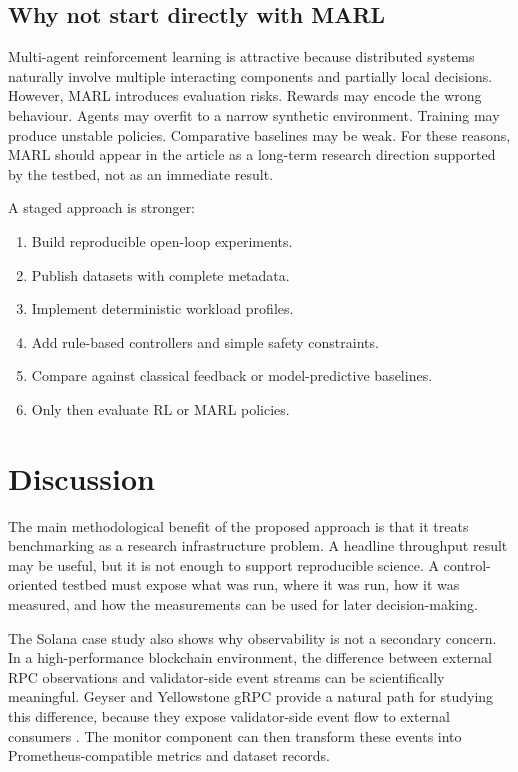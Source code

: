 \documentclass[11pt,a4paper]{article}
\begin{document}
\subsection{Why not start directly with MARL}
\label{subsec:why-not-marl}

Multi-agent reinforcement learning is attractive because distributed systems naturally involve multiple interacting components and partially local decisions. However, MARL introduces evaluation risks. Rewards may encode the wrong behaviour. Agents may overfit to a narrow synthetic environment. Training may produce unstable policies. Comparative baselines may be weak. For these reasons, MARL should appear in the article as a long-term research direction supported by the testbed, not as an immediate result.

A staged approach is stronger:

\begin{enumerate}
  \item Build reproducible open-loop experiments.
  \item Publish datasets with complete metadata.
  \item Implement deterministic workload profiles.
  \item Add rule-based controllers and simple safety constraints.
  \item Compare against classical feedback or model-predictive baselines.
  \item Only then evaluate RL or MARL policies.
\end{enumerate}

\section{Discussion}
\label{sec:discussion}

The main methodological benefit of the proposed approach is that it treats benchmarking as a research infrastructure problem. A headline throughput result may be useful, but it is not enough to support reproducible science. A control-oriented testbed must expose what was run, where it was run, how it was measured, and how the measurements can be used for later decision-making.

The Solana case study also shows why observability is not a secondary concern. In a high-performance blockchain environment, the difference between external RPC observations and validator-side event streams can be scientifically meaningful. Geyser and Yellowstone gRPC provide a natural path for studying this difference, because they expose validator-side event flow to external consumers \cite{anza2026geyser,rpcpool2026yellowstone}. The monitor component can then transform these events into Prometheus-compatible metrics and dataset records.
\end{document}
